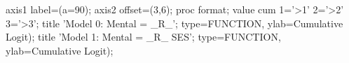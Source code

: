 \begin{listing}
axis1 label=(a=90);
axis2 offset=(3,6);
proc format;
   value cum 1='>1'  2='>2'  3='>3';
title 'Model 0: Mental = _R_';
   type=FUNCTION, ylab=Cumulative Logit);
title 'Model 1: Mental = _R_ SES';
   type=FUNCTION, ylab=Cumulative Logit);
\end{listing}
